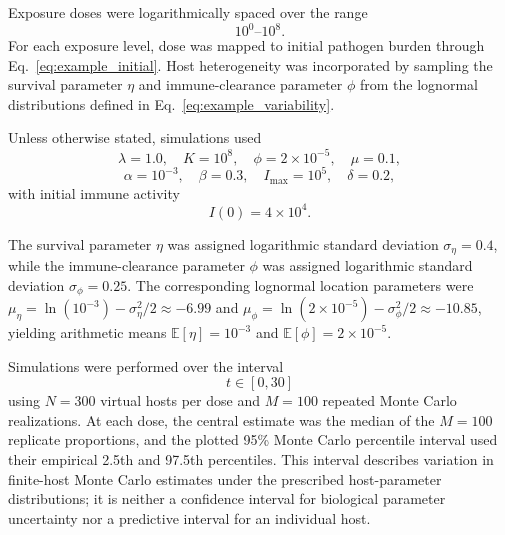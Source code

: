 \documentclass[11pt]{article}
\begin{document}

Exposure doses were logarithmically spaced over the range
\[
10^0 \text{--} 10^8.
\]
For each exposure level, dose was mapped to initial pathogen burden through Eq.~\eqref{eq:example_initial}.
Host heterogeneity was incorporated by sampling the survival parameter $\eta$ and immune-clearance parameter $\phi$ from the lognormal distributions defined in Eq.~\eqref{eq:example_variability}.

Unless otherwise stated, simulations used
\[
\lambda=1.0,\quad
K=10^8,\quad
\phi=2\times10^{-5},\quad
\mu=0.1,
\]
\[
\alpha=10^{-3},\quad
\beta=0.3,\quad
I_{\max}=10^5,\quad
\delta=0.2,
\]
with initial immune activity
\[
I(0)=4\times10^4.
\]

The survival parameter $\eta$ was assigned logarithmic standard deviation $\sigma_\eta=0.4$, while the immune-clearance parameter $\phi$ was assigned logarithmic standard deviation $\sigma_\phi=0.25$. The corresponding lognormal location parameters were
$\mu_\eta=\ln(10^{-3})-\sigma_\eta^2/2
\approx -6.99$ and
$\mu_\phi=\ln(2\times10^{-5})-\sigma_\phi^2/2
\approx -10.85$,
yielding arithmetic means
$\mathbb{E}[\eta]=10^{-3}$ and
$\mathbb{E}[\phi]=2\times10^{-5}$.


Simulations were performed over the interval
\[
t\in[0,30]
\]
using $N=300$ virtual hosts per dose and $M=100$ repeated Monte Carlo realizations. At each dose, the central estimate was the median of the $M=100$ replicate proportions, and the plotted 95\% Monte Carlo percentile interval used their empirical 2.5th and 97.5th percentiles. This interval describes variation in finite-host Monte Carlo estimates under the prescribed host-parameter distributions; it is neither a confidence interval for biological parameter uncertainty nor a predictive interval for an individual host.
\end{document}
